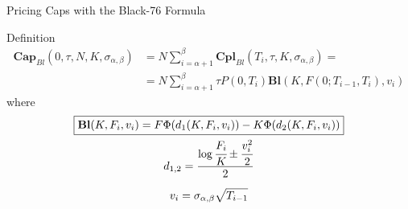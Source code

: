 \documentclass{beamer}
\begin{document}

\begin{frame}{Pricing Caps with the Black-76 Formula}
	\begin{block}{Definition}
		\begin{equation}
			\begin{aligned}
				\textbf{Cap}_{Bl}(0, \tau,N,K,\sigma_{\alpha,\beta}) &= N\sum_{i=\alpha+1}^{\beta}\textbf{Cpl}_{Bl}(T_i, \tau,K,\sigma_{\alpha,\beta}) = \\ &=N\sum_{i=\alpha+1}^{\beta}\tau P(0,T_i) \textbf{Bl}(K,F(0;T_{i-1},T_i),v_i)
			\end{aligned}
			\label{eq:cap_black}
		\end{equation}
		where
		\begin{equation*}
			\begin{gathered}
				\boxed{\textbf{Bl}(K,F_i,v_i)=F\Phi(d_1(K,F_i,v_i)) - K\Phi(d_2(K,F_i,v_i))} \\
				d_{1,2} = \frac{\log{\cfrac{F_i}{K}} \pm \cfrac{v_i^2}{2}}{2} \\[0.2cm]
				v_i = \sigma_{\alpha,\beta}\sqrt{T_{i-1}}
			\end{gathered}
		\end{equation*}
	\end{block}
\end{frame}
\end{document}
